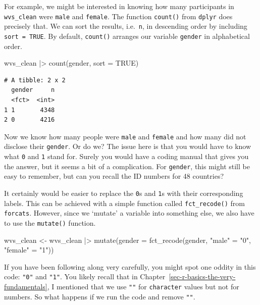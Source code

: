 \documentclass[
  letterpaper,
]{krantz}
\makeatletter
\newenvironment{Shaded}{\begin{snugshade}}{\end{snugshade}}
\newcommand{\AttributeTok}[1]{\textcolor[rgb]{0.40,0.45,0.13}{#1}}
\newcommand{\ConstantTok}[1]{\textcolor[rgb]{0.56,0.35,0.01}{#1}}
\newcommand{\FunctionTok}[1]{\textcolor[rgb]{0.28,0.35,0.67}{#1}}
\newcommand{\NormalTok}[1]{\textcolor[rgb]{0.00,0.23,0.31}{#1}}
\newcommand{\OtherTok}[1]{\textcolor[rgb]{0.00,0.23,0.31}{#1}}
\newcommand{\SpecialCharTok}[1]{\textcolor[rgb]{0.37,0.37,0.37}{#1}}
\newcommand{\StringTok}[1]{\textcolor[rgb]{0.13,0.47,0.30}{#1}}
\newenvironment{kframe}{%
\medskip{}
\setlength{\fboxsep}{.8em}
 \def\at@end@of@kframe{}%
 \ifinner\ifhmode%
  \def\at@end@of@kframe{\end{minipage}}%
  \begin{minipage}{\columnwidth}%
 \fi\fi%
 \def\FrameCommand##1{\hskip\@totalleftmargin \hskip-\fboxsep
 \colorbox{shadecolor}{##1}\hskip-\fboxsep
     \hskip-\linewidth \hskip-\@totalleftmargin \hskip\columnwidth}%
 \MakeFramed {\advance\hsize-\width
   \@totalleftmargin\z@ \linewidth\hsize
   \@setminipage}}%
 {\par\unskip\endMakeFramed%
 \at@end@of@kframe}
\renewenvironment{Shaded}{\begin{kframe}}{\end{kframe}}
\makeatother
\begin{document}
For example, we might be interested in knowing how many participants in
\texttt{wvs\_clean} were \texttt{male} and \texttt{female}. The function
\texttt{count()} from \texttt{dplyr} does precisely that. We can sort
the results, i.e.~\texttt{n}, in descending order by including
\texttt{sort\ =\ TRUE}. By default, \texttt{count()} arranges our
variable \texttt{gender} in alphabetical order.

\begin{Shaded}
\begin{Highlighting}[]
\NormalTok{wvs\_clean }\SpecialCharTok{|\textgreater{}} \FunctionTok{count}\NormalTok{(gender, }\AttributeTok{sort =} \ConstantTok{TRUE}\NormalTok{)}
\end{Highlighting}
\end{Shaded}

\begin{verbatim}
# A tibble: 2 x 2
  gender     n
  <fct>  <int>
1 1       4348
2 0       4216
\end{verbatim}

Now we know how many people were \texttt{male} and \texttt{female} and
how many did not disclose their \texttt{gender}. Or do we? The issue
here is that you would have to know what \texttt{0} and \texttt{1} stand
for. Surely you would have a coding manual that gives you the answer,
but it seems a bit of a complication. For \texttt{gender}, this might
still be easy to remember, but can you recall the ID numbers for 48
countries?

It certainly would be easier to replace the \texttt{0}s and \texttt{1}s
with their corresponding labels. This can be achieved with a simple
function called \texttt{fct\_recode()} from \texttt{forcats}. However,
since we `mutate' a variable into something else, we also have to use
the \texttt{mutate()} function.

\begin{Shaded}
\begin{Highlighting}[]
\NormalTok{wvs\_clean }\OtherTok{\textless{}{-}}
\NormalTok{  wvs\_clean }\SpecialCharTok{|\textgreater{}}
  \FunctionTok{mutate}\NormalTok{(}\AttributeTok{gender =} \FunctionTok{fct\_recode}\NormalTok{(gender,}
                             \StringTok{"male"} \OtherTok{=} \StringTok{"0"}\NormalTok{,}
                             \StringTok{"female"} \OtherTok{=} \StringTok{"1"}\NormalTok{))}
\end{Highlighting}
\end{Shaded}

If you have been following along very carefully, you might spot one
oddity in this code: \texttt{"0"} and \texttt{"1"}. You likely recall
that in Chapter~\ref{sec-r-basics-the-very-fundamentals}, I mentioned
that we use \texttt{""} for \texttt{character} values but not for
numbers. So what happens if we run the code and remove \texttt{""}.
\end{document}
